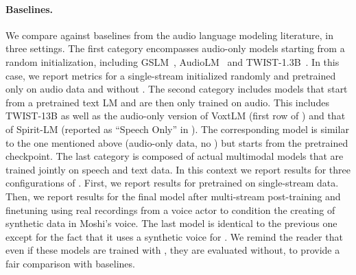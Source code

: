 \paragraph{Baselines.} We compare against baselines from the audio language modeling literature, in three settings. The first category encompasses audio-only models starting from a random initialization, including GSLM~\citep{gslm}, AudioLM~\citep{audiolm} and TWIST-1.3B~\citep{twist}. In this case, we report metrics for a single-stream \ours{} initialized randomly and pretrained only on audio data and without \interleaving{}. The second category includes models that start from a pretrained text LM and are then only trained on audio. This includes TWIST-13B as well as the audio-only version of VoxtLM (first row of \citep[Table 3]{voxtlm}) and that of Spirit-LM (reported as ``Speech Only'' in \citep[Table 5]{spiritlm}). The corresponding \ours{} model is similar to the one mentioned above (audio-only data, no \interleaving{}) but starts from the pretrained \helium{} checkpoint. The last category is composed of actual multimodal models that are trained jointly on speech and text data. In this context we report results for three configurations of \ours{}. First, we report results for \ours{} pretrained on single-stream data. Then, we report results for the final model after multi-stream post-training and finetuning using real recordings from a voice actor to condition the creating of synthetic data in Moshi's voice. The last model is identical to the previous one except for the fact that it uses a synthetic voice for \ours{}. We remind the reader that even if these models are trained with \interleaving{}, they are evaluated without, to provide a fair comparison with baselines.
